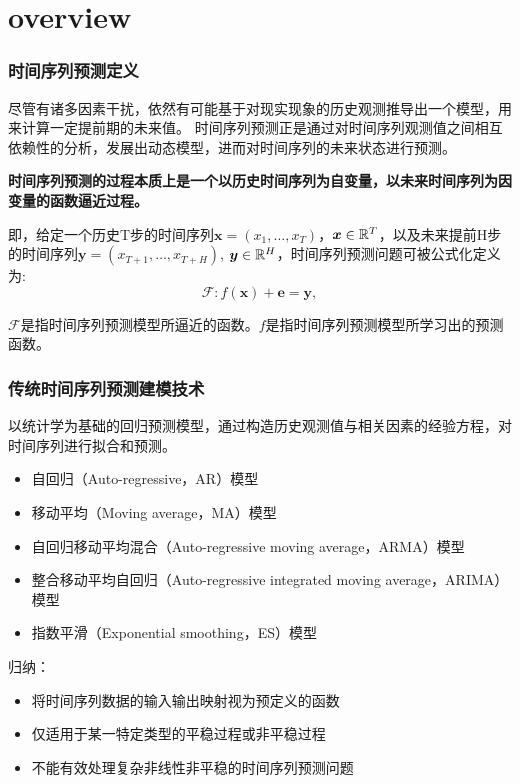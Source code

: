 \section{overview}

\begin{frame}
    \frametitle{时间序列预测定义}
    尽管有诸多因素干扰，依然有可能基于对现实现象的历史观测推导出一个模型，用来计算一定提前期的未来值。
    时间序列预测正是通过对时间序列观测值之间相互依赖性的分析，发展出动态模型，进而对时间序列的未来状态进行预测。

    \vspace*{1em}
    \textbf{时间序列预测的过程本质上是一个以历史时间序列为自变量，以未来时间序列为因变量的函数逼近过程。}

    即，给定一个历史T步的时间序列$\bm{x} = (x_1, \ldots, x_T)$，\(\bm{x} \in \mathbb{R}^{T}\)，以及未来提前H步的时间序列$\bm{y} = (x_{T+1},\ldots,x_{T+H})$, \(\bm{y} \in \mathbb{R}^{H}\)，时间序列预测问题可被公式化定义为:
\begin{equation*}
    \mathcal{F} : f(\bm x) + \bm e = \bm y, \label{eq:sec.intro.def}
\end{equation*}

$\mathcal{F}$是指时间序列预测模型所逼近的函数。\(f\)是指时间序列预测模型所学习出的预测函数。

\end{frame}

\begin{frame}
    \frametitle{传统时间序列预测建模技术}

    以统计学为基础的回归预测模型，通过构造历史观测值与相关因素的经验方程，对时间序列进行拟合和预测。

    \begin{itemize}
        \item 自回归（Auto-regressive，AR）模型
        \item 移动平均（Moving average，MA）模型
        \item 自回归移动平均混合（Auto-regressive moving average，ARMA）模型
        \item 整合移动平均自回归（Auto-regressive integrated moving average，ARIMA）模型
        \item 指数平滑（Exponential smoothing，ES）模型
    \end{itemize}


    归纳：
    \begin{itemize}
        \item 将时间序列数据的输入输出映射视为预定义的函数
        \item 仅适用于某一特定类型的平稳过程或非平稳过程
        \item 不能有效处理复杂非线性非平稳的时间序列预测问题
    \end{itemize}

\end{frame}

